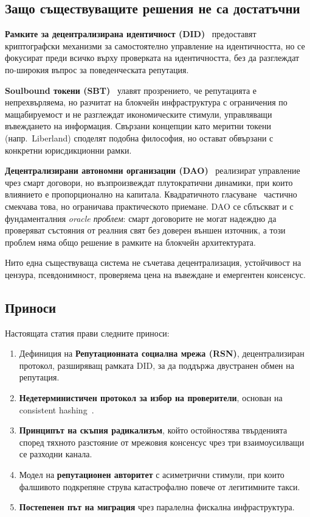 \documentclass[11pt,a4paper,twocolumn]{article}
\begin{document}
\subsection{Защо съществуващите решения не са достатъчни}

\textbf{Рамките за децентрализирана идентичност (DID)}~\cite{did2022} предоставят криптографски механизми за самостоятелно управление на идентичността, но се фокусират преди всичко върху проверката на идентичността, без да разглеждат по-широкия въпрос за поведенческата репутация.

\textbf{Soulbound токени (SBT)}~\cite{weyl2022} улавят прозрението, че репутацията е непрехвърляема, но разчитат на блокчейн инфраструктура с ограничения по мащабируемост и не разглеждат икономическите стимули, управляващи въвеждането на информация. Свързани концепции като меритни токени (напр.\ Liberland) споделят подобна философия, но остават обвързани с конкретни юрисдикционни рамки.

\textbf{Децентрализирани автономни организации (DAO)}~\cite{buterin2014} реализират управление чрез смарт договори, но възпроизвеждат плутократични динамики, при които влиянието е пропорционално на капитала. Квадратичното гласуване~\cite{buterin2019} частично смекчава това, но ограничава практическото приемане. DAO се сблъскват и с фундаменталния \emph{oracle проблем}: смарт договорите не могат надеждно да проверяват състояния от реалния свят без доверен външен източник, а този проблем няма общо решение в рамките на блокчейн архитектурата.

Нито една съществуваща система не съчетава децентрализация, устойчивост на цензура, псевдонимност, проверяема цена на въвеждане и емергентен консенсус.

\subsection{Приноси}

Настоящата статия прави следните приноси:
\begin{enumerate}[nosep]
\item Дефиниция на \textbf{Репутационната социална мрежа (RSN)}, децентрализиран протокол, разширяващ рамката DID, за да поддържа двустранен обмен на репутация.
\item \textbf{Недетерминистичен протокол за избор на проверители}, основан на consistent hashing~\cite{karger1997}.
\item \textbf{Принципът на скъпия радикализъм}, който остойностява твърденията според тяхното разстояние от мрежовия консенсус чрез три взаимоусилващи се разходни канала.
\item Модел на \textbf{репутационен авторитет} с асиметрични стимули, при които фалшивото подкрепяне струва катастрофално повече от легитимните такси.
\item \textbf{Постепенен път на миграция} чрез паралелна фискална инфраструктура.
\end{enumerate}
\end{document}

